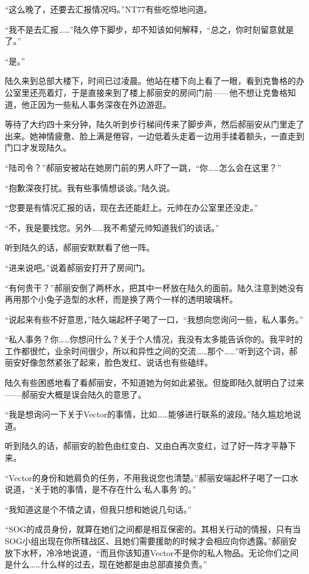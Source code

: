 “这么晚了，还要去汇报情况吗。”NT77有些吃惊地问道。

“我不是去汇报……”陆久停下脚步，却不知该如何解释，“总之，你时刻留意就是了。”

“是。”

陆久来到总部大楼下，时间已过凌晨。他站在楼下向上看了一眼，看到克鲁格的办公室里还亮着灯，于是直接来到了楼上郝丽安的房间门前——他不想让克鲁格知道，他正因为一些私人事务深夜在外边游逛。

等待了大约四十来分钟，陆久听到步行梯间传来了脚步声，然后郝丽安从门里走了出来。她神情疲惫、脸上满是倦容，一边低着头走着一边用手揉着额头，一直走到门口才发现陆久。

“陆司令？”郝丽安被站在她房门前的男人吓了一跳，“你……怎么会在这里？”

“抱歉深夜打扰。我有些事情想谈谈。”陆久说。

“您要是有情况汇报的话，现在去还能赶上。元帅在办公室里还没走。”

“不，我是要找您。另外……我不希望元帅知道我们的谈话。”

听到陆久的话，郝丽安默默看了他一阵。

“进来说吧。”说着郝丽安打开了房间门。

“有何贵干？”郝丽安倒了两杯水，把其中一杯放在陆久的面前。陆久注意到她没有再用那个小兔子造型的水杯，而是换了两个一样的透明玻璃杯。

“说起来有些不好意思，”陆久端起杯子喝了一口，“我想向您询问一些，私人事务。”

“私人事务？你……你想问什么？关于个人情况，我没有太多能告诉你的。我平时的工作都很忙，业余时间很少，所以和异性之间的交流……那个……”听到这个词，郝丽安好像忽然紧张了起来，脸色发红、说话也有些磕绊。

陆久有些困惑地看了看郝丽安，不知道她为何如此紧张。但旋即陆久就明白了过来——郝丽安大概是误会陆久的意思了。

“我是想询问一下关于Vector的事情，比如……能够进行联系的波段。”陆久尴尬地说道。

听到陆久的话，郝丽安的脸色由红变白、又由白再次变红，过了好一阵才平静下来。

“Vector的身份和她肩负的任务，不用我说您也清楚。”郝丽安端起杯子喝了一口水说道，“关于她的事情，是不存在什么‘私人事务’的。”

“我知道这是个不情之请，但我只想和她说几句话。”

“SOG的成员身份，就算在她们之间都是相互保密的。其相关行动的情报，只有当SOG小组出现在你所辖战区、且她们需要援助的时候才会相应向你透露。”郝丽安放下水杯，冷冷地说道，“而且你该知道Vector不是你的私人物品。无论你们之间是什么……什么样的过去，现在她都是由总部直接负责。”

